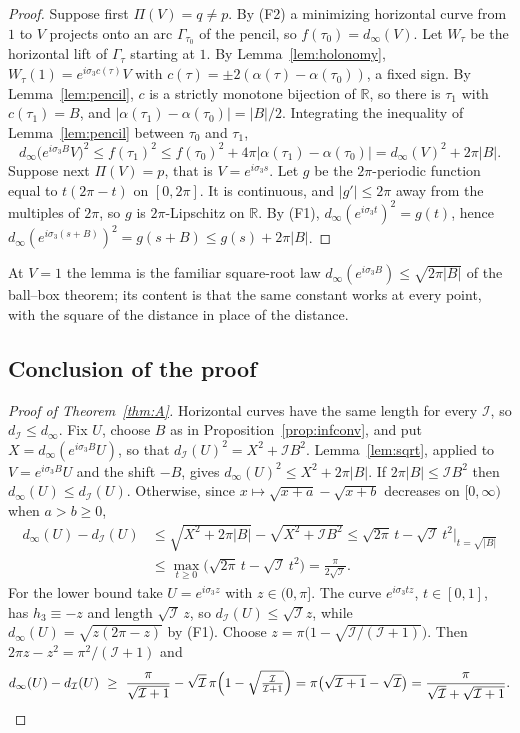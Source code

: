 \documentclass[11pt]{amsart}
\theoremstyle{definition}
\newcommand{\RR}{\mathbb{R}}
\newcommand{\I}{\mathcal{I}}
\newcommand{\dinf}{d_{\infty}}
\begin{document}
\begin{proof}
Suppose first $\Pi(V)=q\neq p$. By (F2) a minimizing horizontal curve from $1$ to $V$ projects onto an arc $\Gamma_{\tau_0}$ of the pencil, so $f(\tau_0)=\dinf(V)$. Let $W_\tau$ be the horizontal lift of $\Gamma_\tau$ starting at $1$. By Lemma~\ref{lem:holonomy}, $W_\tau(1)=e^{i\sigma_3c(\tau)}V$ with $c(\tau)=\pm2(\alpha(\tau)-\alpha(\tau_0))$, a fixed sign. By Lemma~\ref{lem:pencil}, $c$ is a strictly monotone bijection of $\RR$, so there is $\tau_1$ with $c(\tau_1)=B$, and $|\alpha(\tau_1)-\alpha(\tau_0)|=|B|/2$. Integrating the inequality of Lemma~\ref{lem:pencil} between $\tau_0$ and $\tau_1$,
\[
\dinf\bigl(e^{i\sigma_3B}V\bigr)^2\le f(\tau_1)^2\le f(\tau_0)^2+4\pi|\alpha(\tau_1)-\alpha(\tau_0)|=\dinf(V)^2+2\pi|B| .
\]
Suppose next $\Pi(V)=p$, that is $V=e^{i\sigma_3s}$. Let $g$ be the $2\pi$-periodic function equal to $t(2\pi-t)$ on $[0,2\pi]$. It is continuous, and $|g'|\le2\pi$ away from the multiples of $2\pi$, so $g$ is $2\pi$-Lipschitz on $\RR$. By (F1), $\dinf(e^{i\sigma_3t})^2=g(t)$, hence $\dinf(e^{i\sigma_3(s+B)})^2=g(s+B)\le g(s)+2\pi|B|$.
\end{proof}

At $V=1$ the lemma is the familiar square-root law $\dinf(e^{i\sigma_3B})\le\sqrt{2\pi|B|}$ of the ball--box theorem; its content is that the same constant works at every point, with the square of the distance in place of the distance.

\subsection{Conclusion of the proof}

\begin{proof}[Proof of Theorem~\ref{thm:A}]
Horizontal curves have the same length for every $\I$, so $d_\I\le\dinf$. Fix $U$, choose $B$ as in Proposition~\ref{prop:infconv}, and put $X=\dinf(e^{i\sigma_3B}U)$, so that $d_\I(U)^2=X^2+\I B^2$. Lemma~\ref{lem:sqrt}, applied to $V=e^{i\sigma_3B}U$ and the shift $-B$, gives $\dinf(U)^2\le X^2+2\pi|B|$. If $2\pi|B|\le\I B^2$ then $\dinf(U)\le d_\I(U)$. Otherwise, since $x\mapsto\sqrt{x+a}-\sqrt{x+b}$ decreases on $[0,\infty)$ when $a>b\ge0$,
\begin{align*}
\dinf(U)-d_\I(U)&\le\sqrt{X^2+2\pi|B|}-\sqrt{X^2+\I B^2}\le\sqrt{2\pi}\,t-\sqrt{\I}\,t^2\Big|_{t=\sqrt{|B|}}\\
&\le\max_{t\ge0}\bigl(\sqrt{2\pi}\,t-\sqrt{\I}\,t^2\bigr)=\frac{\pi}{2\sqrt{\I}} .
\end{align*}
For the lower bound take $U=e^{i\sigma_3z}$ with $z\in(0,\pi]$. The curve $e^{i\sigma_3tz}$, $t\in[0,1]$, has $h_3\equiv-z$ and length $\sqrt{\I}\,z$, so $d_\I(U)\le\sqrt{\I}z$, while $\dinf(U)=\sqrt{z(2\pi-z)}$ by (F1). Choose $z=\pi\bigl(1-\sqrt{\I/(\I+1)}\bigr)$. Then $2\pi z-z^2=\pi^2/(\I+1)$ and
\[
\dinf(U)-d_\I(U)\ \ge\ \frac{\pi}{\sqrt{\I+1}}-\sqrt{\I}\,\pi\Bigl(1-\sqrt{\tfrac{\I}{\I+1}}\Bigr)=\pi\bigl(\sqrt{\I+1}-\sqrt{\I}\bigr)=\frac{\pi}{\sqrt{\I}+\sqrt{\I+1}} .\qedhere
\]
\end{proof}
\end{document}
